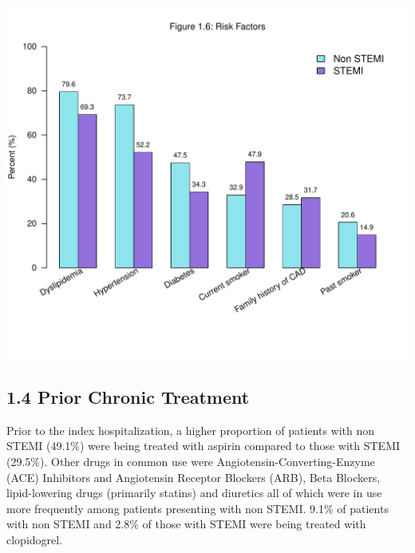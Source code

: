 \documentclass[
]{article}
\begin{document}
\includegraphics{‏‏ACSIS_2024_v1_with_trend_pdf_files/figure-latex/unnamed-chunk-22-1.pdf}

\pagebreak

\subsection{1.4 Prior Chronic Treatment}\label{prior-chronic-treatment}

Prior to the index hospitalization, a higher proportion of patients with
non STEMI (49.1\%) were being treated with aspirin compared to those
with STEMI (29.5\%). Other drugs in common use were
Angiotensin-Converting-Enzyme (ACE) Inhibitors and Angiotensin Receptor
Blockers (ARB), Beta Blockers, lipid-lowering drugs (primarily statins)
and diuretics all of which were in use more frequently among patients
presenting with non STEMI. 9.1\% of patients with non STEMI and 2.8\% of
those with STEMI were being treated with clopidogrel.

~
\end{document}
